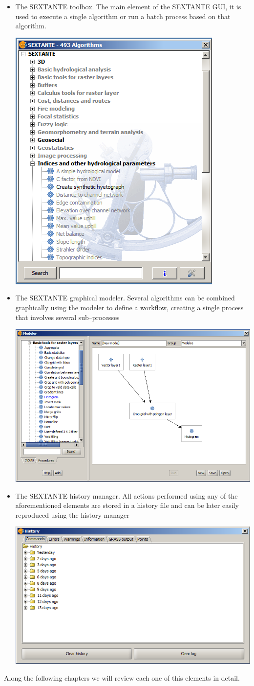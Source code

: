 \begin{itemize}
	\item The SEXTANTE toolbox. The main element of the SEXTANTE GUI, it is used to execute a single algorithm or run a batch process based on that algorithm.
		\begin{center}
		\includegraphics[width=.5\columnwidth]{toolbox.png}
		\end{center}
	\item The SEXTANTE graphical modeler. Several algorithms can be combined graphically using the modeler to define a workflow, creating a single process that involves several sub--processes
		\begin{center}
		\includegraphics[width=.8\columnwidth]{models.png}
		\end{center}			
	\item The SEXTANTE history manager. All actions performed using any of the aforementioned elements are stored in a history file and can be later easily reproduced using the history manager
			\begin{center}
			\includegraphics[width=.8\columnwidth]{history.png}
			\end{center}	
\end{itemize}

Along the following chapters we will review each one of this elements in detail.